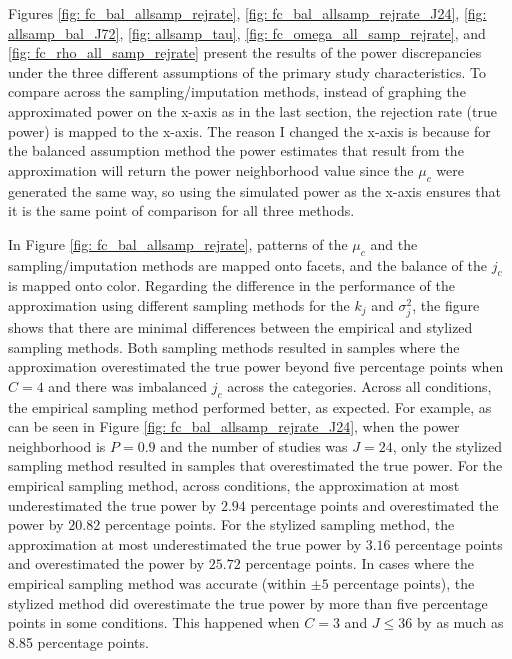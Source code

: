 Figures \ref{fig: fc_bal_allsamp_rejrate}, \ref{fig: fc_bal_allsamp_rejrate_J24}, \ref{fig: allsamp_bal_J72}, \ref{fig: allsamp_tau}, \ref{fig: fc_omega_all_samp_rejrate}, and \ref{fig: fc_rho_all_samp_rejrate} present the results of the power discrepancies under the three different assumptions of the primary study characteristics. To compare across the sampling/imputation methods, instead of graphing the approximated power on the x-axis as in the last section, the rejection rate (true power) is mapped to the x-axis. The reason I changed the x-axis is because for the balanced assumption method the power estimates that result from the approximation will return the power neighborhood value since the $\mu_c$ were generated the same way, so using the simulated power as the x-axis ensures that it is the same point of comparison for all three methods. 


In Figure \ref{fig: fc_bal_allsamp_rejrate}, patterns of the $\mu_c$ and the sampling/imputation methods are mapped onto facets, and the balance of the $j_c$ is mapped onto color. Regarding the difference in the performance of the approximation using different sampling methods for the $k_j$ and $\sigma_j^2$, the figure shows that there are minimal differences between the empirical and stylized sampling methods. Both sampling methods resulted in samples where the approximation overestimated the true power beyond five percentage points when $C = 4$ and there was imbalanced $j_c$ across the categories. Across all conditions, the empirical sampling method performed better, as expected. For example, as can be seen in Figure \ref{fig: fc_bal_allsamp_rejrate_J24}, when the power neighborhood is $P = 0.9$ and the number of studies was $J= 24$, only the stylized sampling method resulted in samples that overestimated the true power. For the empirical sampling method, across conditions, the approximation at most underestimated the true power by $2.94$ percentage points and overestimated the power by $20.82$ percentage points. For the stylized sampling method, the approximation at most underestimated the true power by $3.16$ percentage points and overestimated the power by $25.72$ percentage points. In cases where the empirical sampling method was accurate (within $\pm 5$ percentage points), the stylized method did overestimate the true power by more than five percentage points in some conditions. This happened when $C = 3$ and $J \leq 36$ by as much as 8.85 percentage points. 

